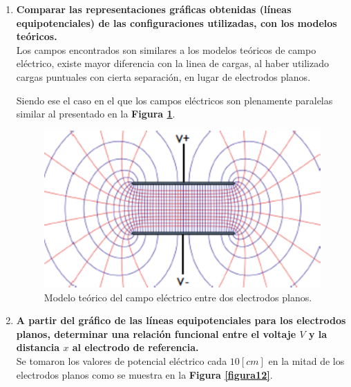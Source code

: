 \documentclass[letter,11pt]{article}
\begin{document}
\begin{enumerate}
\item \textbf{Comparar las representaciones gráficas obtenidas (líneas
equipotenciales) de las configuraciones utilizadas, con los modelos
teóricos.} \\
Los campos encontrados son similares a los modelos teóricos de campo eléctrico,
existe mayor diferencia con la linea de cargas, al haber utilizado cargas
puntuales con cierta separación, en lugar de electrodos planos.

Siendo ese el caso en el que los campos eléctricos son plenamente paralelas
similar al presentado en la \textbf{Figura \ref{figura11}}.

\begin{figure}[!h]
\centering
\includegraphics[scale=0.50]{resources/figura11.eps}
\caption{Modelo teórico del campo eléctrico entre dos electrodos planos.}
\label{figura11}
\end{figure}

\item \textbf{A partir del gráfico de las líneas equipotenciales para los
electrodos planos, determinar una relación funcional entre el voltaje $V$ y la
distancia $x$ al electrodo de referencia.} \\

Se tomaron los valores de potencial eléctrico cada $10 [cm]$ en la mitad
de los electrodos planos como se muestra en la \textbf{Figura \ref{figura12}}.


\end{enumerate}
\end{document}

